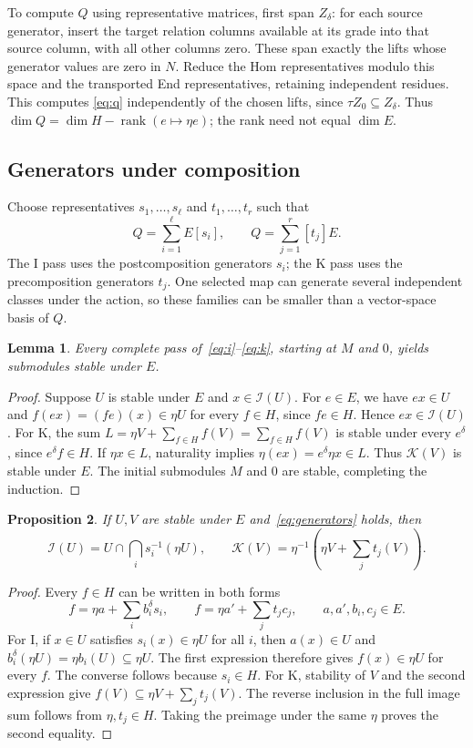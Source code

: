 \documentclass[11pt,a4paper]{article}
\newtheorem{proposition}{Proposition}
\newtheorem{lemma}[proposition]{Lemma}
\begin{document}
To compute $Q$ using representative matrices, first span $Z_\delta$:
for each source generator, insert the target relation columns available
at its grade into that source column, with all other columns zero.
These span exactly the lifts whose generator values are zero in $N$.
Reduce the Hom representatives modulo this space and the transported
End representatives, retaining independent residues. This computes
\eqref{eq:q} independently of the chosen lifts, since
$\tau Z_0\subseteq Z_\delta$. Thus
$\dim Q=\dim H-\operatorname{rank}(e\mapsto\eta e)$; the rank need
not equal $\dim E$.

\subsection{Generators under composition}
Choose representatives $s_1,\ldots,s_\ell$ and $t_1,\ldots,t_r$ such that
\begin{equation}\label{eq:generators}
 Q=\sum_{i=1}^{\ell}E[s_i],\qquad
 Q=\sum_{j=1}^{r}[t_j]E.
\end{equation}
The I pass uses the postcomposition generators $s_i$; the K pass uses
the precomposition generators $t_j$. One selected map can generate
several independent classes under the action, so these families can be
smaller than a vector-space basis of $Q$.

\begin{lemma}\label{lem:invariant}
Every complete pass of~\eqref{eq:i}--\eqref{eq:k}, starting at $M$ and
$0$, yields submodules stable under $E$.
\end{lemma}
\begin{proof}
Suppose $U$ is stable under $E$ and $x\in\mathcal I(U)$. For $e\in E$,
we have $ex\in U$ and $f(ex)=(fe)(x)\in\eta U$ for every $f\in H$,
since $fe\in H$. Hence $ex\in\mathcal I(U)$.
For K, the sum $L=\eta V+\sum_{f\in H}f(V)=\sum_{f\in H}f(V)$
is stable under every $e^\delta$, since $e^\delta f\in H$.
If $\eta x\in L$, naturality implies $\eta(ex)=e^\delta\eta x\in L$.
Thus $\mathcal K(V)$ is stable under $E$. The initial submodules $M$
and $0$ are stable, completing the induction.
\end{proof}

\begin{proposition}\label{prop:families}
If $U,V$ are stable under $E$ and~\eqref{eq:generators} holds, then
\[
 \mathcal I(U)=U\cap\bigcap_i s_i^{-1}(\eta U),\qquad
 \mathcal K(V)=\eta^{-1}\!\left(\eta V+\sum_j t_j(V)\right).
\]
\end{proposition}
\begin{proof}
Every $f\in H$ can be written in both forms
\[
 f=\eta a+\sum_i b_i^\delta s_i,
 \qquad f=\eta a'+\sum_j t_jc_j,
 \qquad a,a',b_i,c_j\in E.
\]
For I, if $x\in U$ satisfies $s_i(x)\in\eta U$ for all $i$, then
$a(x)\in U$ and $b_i^\delta(\eta U)=\eta b_i(U)\subseteq\eta U$.
The first expression therefore gives $f(x)\in\eta U$ for every $f$.
The converse follows because $s_i\in H$.
For K, stability of $V$ and the second expression give
$f(V)\subseteq\eta V+\sum_j t_j(V)$. The reverse inclusion in the
full image sum follows from $\eta,t_j\in H$. Taking the preimage under
the same $\eta$ proves the second equality.
\end{proof}
\end{document}

